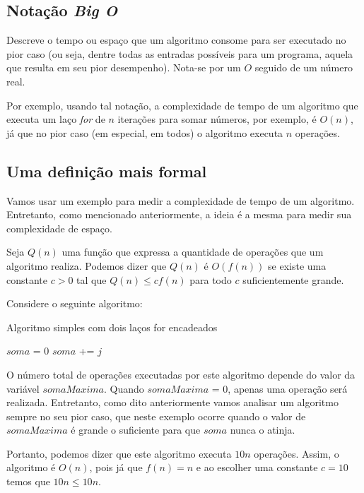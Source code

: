 \subsection{Notação \emph{Big O}}
Descreve o tempo ou espaço que um algoritmo consome para ser executado no 
pior caso (ou seja, dentre todas as entradas possíveis para um programa, aquela 
que resulta em seu pior desempenho). Nota-se por um $O$ seguido de um número real. 

Por exemplo, usando tal notação, a complexidade de tempo de um algoritmo que 
executa um laço \emph{for} de $n$ iterações para somar números, por exemplo, é 
$O(n)$, já que no pior caso (em especial, em todos) o algoritmo executa $n$ 
operações.

\subsection{Uma definição mais formal}
Vamos usar um exemplo para medir a complexidade de tempo de um algoritmo. 
Entretanto, como mencionado anteriormente, a ideia é a mesma para medir sua 
complexidade de espaço.

Seja $Q(n)$ uma função que expressa a quantidade de operações que um algoritmo 
realiza. Podemos dizer que $Q(n)$ é $O(f(n))$ se existe uma constante $c > 0$ 
tal que $Q(n) \leq c f(n)$ para todo $c$ suficientemente grande.

\hspace{1cm}

Considere o seguinte algoritmo:

\begin{algorithm}
\caption{Algoritmo simples com dois laços for encadeados}\label{euclid}
\begin{algorithmic}[1]

\State $soma$ = 0
        \State $soma$ += $j$
        \State \Return
        \EndIf
    \EndFor
\EndFor
\end{algorithmic}
\end{algorithm}

O número total de operações executadas por este algoritmo depende do valor 
da variável $somaMaxima$. Quando $somaMaxima$ = 0, apenas uma operação será 
realizada. Entretanto, como dito anteriormente vamos analisar um algoritmo 
sempre no seu pior caso, que neste exemplo ocorre quando o valor de $somaMaxima$
é grande o suficiente para que $soma$ nunca o atinja.

Portanto, podemos dizer que este algoritmo executa $10n$ operações. Assim, o 
algoritmo é $O(n)$, pois já que $f(n) = n$ e ao escolher uma constante $c = 10$ 
temos que $10n \leq 10n$.
